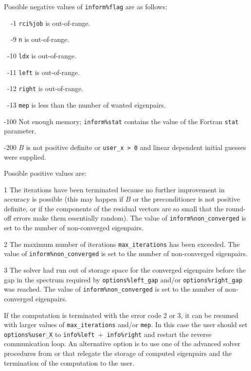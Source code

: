 \documentclass{spral}
\begin{document}
\noindent
Possible negative values of {\tt inform\%flag}
are as follows:
%
\begin{description}
%
\item{~~-1}
\hskip 9pt
{\tt rci\%job}  is out-of-range.
%
\item{~~-9}
\hskip 7pt
{\tt n} is out-of-range.
%
\item{~-10}
\hskip 7pt
{\tt ldx} is out-of-range.
%
\item{~-11}
\hskip 7pt
{\tt left} is out-of-range.
%
\item{~-12}
\hskip 7pt
{\tt right} is out-of-range.
%
\item{~-13}
\hskip 7pt
{\tt mep} is less than 
the number of wanted eigenpairs.
%
\item{-100}
\hskip 4pt
Not enough memory;
{\tt inform\%stat} contains the value of the Fortran {\tt stat} parameter.
%
\item{-200}
\hskip 4pt
$B$ is not positive definite or {\tt user\_x > 0} and
linear dependent initial guesses were supplied.
%
\end{description}

\noindent
Possible positive values  are: 
%
\begin{description}
\item{1}
\hskip 9pt
The iterations have been terminated because no further improvement
in accuracy is possible (this may happen if $B$ or the preconditioner is
not positive definite, or if the components of the residual vectors
are so small that the round-off
errors make them essentially random).
The value of {\tt inform\%non\_converged} is set to the number
of non-converged eigenpairs.
\item{2}
\hskip 9pt
The maximum number of iterations {\tt max\_iterations} has been exceeded.
The value of {\tt inform\%non\_converged} is set to the number
of non-converged eigenpairs.
\item{3}
\hskip 9pt
The solver had run
out of storage space for the converged eigenpairs
before the gap in the spectrum 
required by {\tt options\%left\_gap} and/or {\tt options\%right\_gap}
was reached.
The value of {\tt inform\%non\_converged} is set to the number
of non-converged eigenpairs.
%
\end{description}

If the computation is terminated with the error code 2 or 3,
it can be resumed with larger values of {\tt max\_iterations} and/or {\tt mep}.
In this case the user should set {\tt options\%user\_X} to
{\tt info\%left $+$ info\%right}
and restart the reverse communication loop.
An alternative option is to use
one of the advanced solver procedures
from {\tt \advanced} or {\tt \engine}
that relegate the storage of computed eigenpairs and
the termination of the computation to the user.
\end{document}
